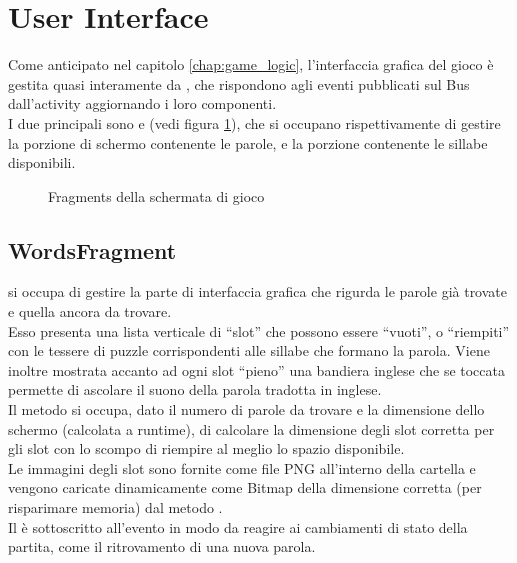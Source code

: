 


\section{User Interface}
\label{chap:ui}

Come anticipato nel capitolo \ref{chap:game_logic}, l'interfaccia grafica del gioco è gestita quasi interamente da , che rispondono agli eventi pubblicati sul Bus dall'activity  aggiornando i loro componenti.\\
I due principali  sono  e  (vedi figura \ref{fig:fragments}), che si occupano rispettivamente di gestire la porzione di schermo contenente le parole, e la porzione contenente le sillabe disponibili.

\begin{figure}[h!]
\label{fig:fragments}
  \centering
  \caption{Fragments della schermata di gioco}
\end{figure}


\subsection{WordsFragment}
\label{sec:words_fragment}
 si occupa di gestire la parte di interfaccia grafica che rigurda le parole già trovate e quella ancora da trovare.\\
Esso presenta una lista verticale di ``slot'' che possono essere ``vuoti'', o ``riempiti'' con le tessere di puzzle corrispondenti alle sillabe che formano la parola. Viene inoltre mostrata accanto ad ogni slot ``pieno'' una bandiera inglese che se toccata permette di ascolare il suono della parola tradotta in inglese.\\
Il metodo  si occupa, dato il numero di parole da trovare e la dimensione dello schermo (calcolata a runtime), di calcolare la dimensione degli slot corretta per gli slot con lo scompo di riempire al meglio lo spazio disponibile.\\
Le immagini degli slot sono fornite come file PNG all'interno della cartella  e vengono caricate dinamicamente come Bitmap della dimensione corretta (per risparimare memoria) dal metodo .\\
Il  è sottoscritto all'evento  in modo da reagire ai cambiamenti di stato della partita, come il ritrovamento di una nuova parola.

